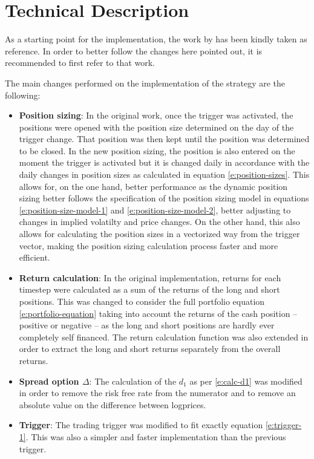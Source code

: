 \section{Technical Description}
As a starting point for the implementation, the work by \cite{gallego_2023} has been kindly taken as reference. In order to better follow the changes here pointed out, it is recommended to first refer to that work.

The main changes performed on the implementation of the strategy are the following:

\begin{itemize}
    \item \textbf{Position sizing}: In the original work, once the trigger was activated, the positions were opened with the position size determined on the day of the trigger change. That position was then kept until the position was determined to be closed. In the new position sizing, the position is also entered on the moment the trigger is activated but it is changed daily in accordance with the daily changes in position sizes as calculated in equation \eqref{e:position-sizes}. This allows for, on the one hand, better performance as the dynamic position sizing better follows the specification of the position sizing model in equations \eqref{e:position-size-model-1} and \eqref{e:position-size-model-2}, better adjusting to changes in implied volatilty and price changes. On the other hand, this also allows for calculating the position sizes in a vectorized way from the trigger vector, making the position sizing calculation process faster and more efficient. 
    \item \textbf{Return calculation}: In the original implementation, returns for each timestep were calculated as a sum of the returns of the long and short positions. This was changed to consider the full portfolio equation \eqref{e:portfolio-equation} taking into account the returns of the cash position -- positive or negative -- as the long and short positions are hardly ever completely self financed. The return calculation function was also extended in order to extract the long and short returns separately from the overall returns. 
    \item \textbf{Spread option $\Delta$}: The calculation of the $d_1$ as per \eqref{e:calc-d1} was modified in order to remove the risk free rate from the numerator and to remove an absolute value on the difference between logprices. 
    \item \textbf{Trigger}: The trading trigger was modified to fit exactly equation \eqref{e:trigger-1}. This was also a simpler and faster implementation than the previous trigger. 

\end{itemize}
